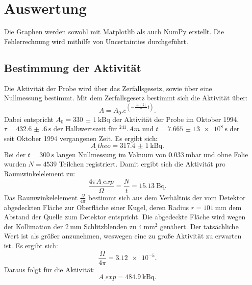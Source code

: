 \section{Auswertung}
\label{sec:Auswertung}

Die Graphen werden sowohl mit Matplotlib \cite{matplotlib} als auch NumPy \cite{numpy} erstellt. Die Fehlerrechnung wird mithilfe von Uncertainties \cite{uncertainties} durchgeführt.

\subsection{Bestimmung der Aktivität}

Die Aktivität der Probe wird über das Zerfallsgesetz, sowie über eine Nullmessung bestimmt.
Mit dem Zerfallsgesetz bestimmt sich die Aktivität über: 
\[
A = A_0 .e^{(-\frac{\ln(2)}{\tau}t)}\text{.}
\]
Dabei entspricht $A_0 = \SI{330(1)}{\kilo\becquerel}$ der Aktivität der Probe im Oktober 1994, $\tau = \SI{432.6(6)}{\second}$ der Halbwertszeit für $^{241}.{Am}$ und $t = \SI{7,665(13)e8}{\second}$ der seit Oktober 1994 vergangenen Zeit. Es ergibt sich:
\[
A_.{theo} = \SI{317.4(10)}{\kilo\becquerel} \text{.}
\]
Bei der $t = \SI{300}{\second}$ langen Nullmessung im Vakuum von $\SI{0,033}{\milli\bar}$ und ohne Folie wurden $N = 4539$ Teilchen registriert.
Damit ergibt sich die Aktivität pro Raumwinkelelement zu:
\[
\frac{4\pi A_.{exp}}{\Omega} = \frac{N}{t} = \SI{15,13}{\becquerel} \text{.}
\] 
Das Raumwinkelelement $\frac{\Omega}{4\pi}$ bestimmt sich aus dem Verhältnis der vom Detektor abgedeckten Fläche zur Oberfläche einer Kugel, deren Radius $r = \SI{101}{\milli\metre}$ \cite{V16} dem Abstand der Quelle zum Detektor entspricht. Die abgedeckte Fläche wird wegen der Kollimation der $\SI{2}{\milli\metre}$ Schlitzblenden zu $\SI{4}{\milli\metre\squared}$ genähert. Der tatsächliche Wert ist als größer anzunehmen, weswegen eine zu große Aktivität zu erwarten ist. Es ergibt sich:
\[
\frac{\Omega}{4\pi} = \num{3,12e-5}\text{.}
\]   
Daraus folgt für die Aktivität:
\[
A_.{exp} = \SI{484.9}{\kilo\becquerel} \text{.}
\]